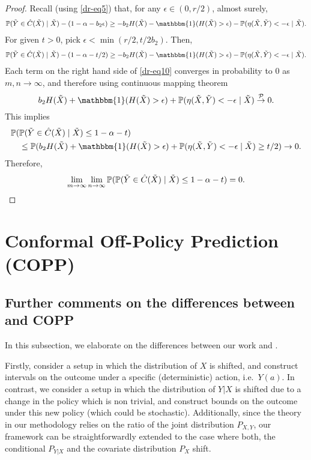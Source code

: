 \begin{proof}
Recall (using \ref{dr-eq5}) that, for any $\epsilon \in (0, r/2)$, almost surely,
\begin{align}
    \p(\tilde{Y} \in \hat{C}(\tilde{X}) \mid \tilde{X}) - (1-\alpha -b_2 \epsilon) \geq - b_2 H(\tilde{X}) - \mathbbm{1}(H(\tilde{X}) > \epsilon) - \p(\eta(\tilde{X}, \tilde{Y}) < -\epsilon \mid \tilde{X}).
\end{align}
For given $t > 0$, pick $\epsilon < \min(r/2, t/2b_2)$. Then,
\begin{align}
    \p(\tilde{Y} \in \hat{C}(\tilde{X}) \mid \tilde{X}) - (1-\alpha -t/2) \geq - b_2 H(\tilde{X}) - \mathbbm{1}(H(\tilde{X}) > \epsilon) - \p(\eta(\tilde{X}, \tilde{Y}) < -\epsilon \mid \tilde{X}). \label{dr-eq10}
\end{align}
Each term on the right hand side of \eqref{dr-eq10} converges in probability to 0 as $m, n \rightarrow \infty$, and therefore using continuous mapping theorem  
$$ 
b_2 H(\tilde{X}) + \mathbbm{1}(H(\tilde{X}) > \epsilon) + \p(\eta(\tilde{X}, \tilde{Y}) < -\epsilon \mid \tilde{X}) \overset{\mathcal{P}}{\rightarrow} 0.
$$
This implies
\begin{align}
    &\p(\p(\tilde{Y} \in \hat{C}(\tilde{X}) \mid \tilde{X}) \leq 1-\alpha -t) \nonumber\\
    &\quad \leq \p(b_2 H(\tilde{X}) + \mathbbm{1}(H(\tilde{X}) > \epsilon) + \p(\eta(\tilde{X}, \tilde{Y}) < -\epsilon \mid \tilde{X}) \geq t/2) \rightarrow 0. \nonumber
\end{align}
Therefore, 
\begin{align}
    \lim_{m \rightarrow \infty} \lim_{n \rightarrow \infty} \mathbb{P}(\mathbb{P}(\tilde{Y} \in \hat{C}(\tilde{X}) \mid \tilde{X}) \leq 1-\alpha -t) = 0.
\end{align}
\end{proof}

\newpage

\section{Conformal Off-Policy Prediction (COPP)}

\subsection{Further comments on the differences between \cite{lei2020conformal} and COPP}\label{sec:comp_lc}
In this subsection, we elaborate on the differences between our work and \cite{lei2020conformal}.


Firstly, \cite{lei2020conformal} consider a setup in which the distribution of $X$ is shifted, and construct intervals on the outcome under a specific (deterministic) action, i.e.\ $Y(a)$. In contrast, we consider a setup in which the distribution of $Y|X$ is shifted due to a change in the policy which is non trivial, and construct bounds on the outcome under this new policy (which could be stochastic). Additionally, since the theory in our methodology relies on the ratio of the joint distribution $P_{X,Y}$, our framework can be straightforwardly extended to the case where both, the conditional $P_{Y|X}$ and the covariate distribution $P_X$ shift.

